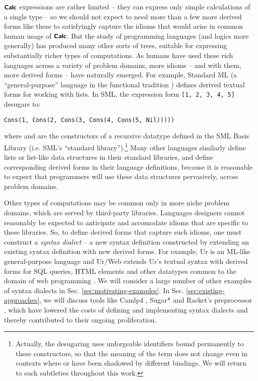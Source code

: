 $\textsf{\textbf{\small Calc}}$ expressions are rather limited -- they can express only simple calculations of a single type -- so we should not expect to need more than a few more derived forms like these to satisfyingly capture the  idioms that would arise in common human usage of $\textsf{\textbf{\small Calc}}$. %
But the study of programming languages (and logics more generally) has produced many other sorts of trees, suitable for expressing substantially richer types of computations.  As humans have used these rich languages across a variety of problem domains, more idioms -- and with them, more derived forms -- have naturally emerged.  For example, Standard ML (a ``general-purpose''  language in the functional tradition \cite{mthm97-for-dart,harper1997programming}) defines derived textual forms for working with lists. In SML, the expression form \lstinline{[1, 2, 3, 4, 5]} desugars to: 
\begin{lstlisting}[numbers=none]
Cons(1, Cons(2, Cons(3, Cons(4, Cons(5, Nil)))))
\end{lstlisting}
where  and  are the constructors of a recursive datatype defined in the SML Basis Library (i.e. SML's ``standard library'').\footnote{Actually, the desugaring uses unforgeable identifiers bound permanently to these constructors, so that the meaning of the term does not change even in contexts where  or  have been shadowed by different bindings. We will return to such subtleties throughout this work.} Many other languages similarly define lists or list-like data structures in their standard libraries, and define corresponding derived forms in their language definitions, because it is reasonable to expect that programmers will use these data structures pervasively, across problem domains.

Other types of computations may be common only in more niche problem domains, which are served by third-party libraries. Languages designers cannot reasonably be expected to anticipate and accomodate idioms that are specific to these libraries. So, to define derived forms that capture such idioms, one must construct a \emph{syntax dialect} -- a new syntax definition constructed by extending an existing syntax definition with  new derived forms. For example, Ur is an ML-like general-purpose language \cite{conf/pldi/Chlipala10} and Ur/Web extends Ur's textual syntax with derived forms for SQL queries, HTML elements and other datatypes common to the domain of web programming \cite{conf/popl/Chlipala15}. %
We will consider a large number of other examples of syntax dialects in Sec. \ref{sec:motivating-examples}. In Sec. \ref{sec:existing-approaches}, we will discuss tools like Camlp4 \cite{ocaml-manual}, Sugar* \cite{erdweg2011sugarj,erdweg2013framework} and Racket's preprocessor \cite{Flatt:2012:CLR:2063176.2063195}, which  have lowered the costs of defining and implementing syntax dialects and thereby contributed to their ongoing proliferation. 


